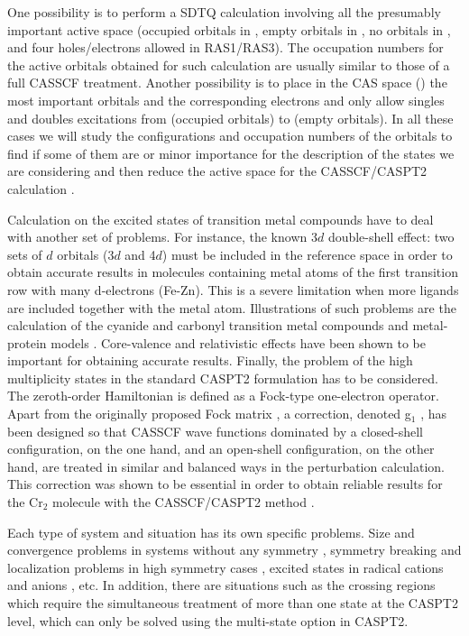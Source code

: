 One possibility is to perform a SDTQ calculation involving all the
presumably important active space (occupied orbitals in ,
empty orbitals in , no orbitals in , and four
holes/electrons allowed in RAS1/RAS3). The occupation numbers for the
active orbitals obtained for such calculation are usually similar to
those of a full CASSCF treatment. Another possibility is to place in
the CAS space () the most important orbitals and
the corresponding electrons and only allow singles and doubles
excitations from  (occupied orbitals) to
 (empty orbitals). In all these cases we will study
the configurations and occupation numbers of the orbitals to find if
some of them are or minor importance for the description of the states
we are considering and then reduce the active space for the CASSCF/CASPT2
calculation \cite{Merchan:94b,Serrano:97a}. 


Calculation on the excited states of transition metal compounds have to 
deal with another set of problems. For instance, the known 3$d$ double-shell
effect: two sets of $d$ orbitals (3$d$ and 4$d$) must be included in the
reference space in order to obtain accurate results \cite{Roos:96b} in
molecules containing metal atoms of the first transition row with many
d-electrons (Fe-Zn). This
is a severe limitation when more ligands are included together with the
metal atom. Illustrations of such problems are the calculation of the
cyanide and carbonyl transition metal compounds \cite{Roos:96b,Pierloot:93a}
and metal-protein models \cite{Pierloot:96a}. Core-valence \cite{Pierloot:93b}
and relativistic effects \cite{Roos:96a} have been shown to be
important for obtaining accurate results. Finally, the problem of the high
multiplicity states in the standard CASPT2 formulation has to be considered.
The zeroth-order Hamiltonian is defined as a Fock-type one-electron operator.
Apart from the originally proposed Fock matrix \cite{Andersson:90,Andersson:92a},
a correction, denoted g$_1$ \cite{Andersson:95a}, has been designed so that
CASSCF wave functions dominated by a closed-shell configuration, on the
one hand, and an open-shell configuration, on the other hand, are treated
in similar and balanced ways in the perturbation calculation. This
correction was shown to be essential in order to obtain reliable results
for the Cr$_2$ molecule with the CASSCF/CASPT2 method \cite{Roos:95b}.


Each type of system and situation has its own specific problems. Size and
convergence problems in systems without any symmetry \cite{Merchan:97,Serrano:95a},
symmetry breaking and localization problems in high symmetry cases
\cite{Merchan:96c}, excited states in radical cations \cite{Fuelscher:95b} and
anions \cite{Rubio:95c}, etc. In addition, there are situations such as
the crossing regions which require the simultaneous treatment of more than
one state at the CASPT2 level, which can only be solved using the multi-state
option in CASPT2.
